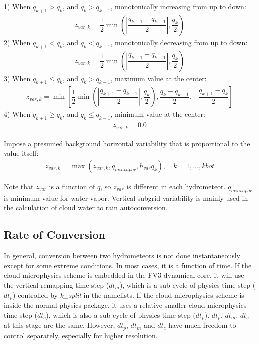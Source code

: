 \documentclass[letterpaper,titlepage,10pt]{article}
\numberwithin{equation}{section}
\begin{document}
1) When $q_{k+1} > q_{k}$, and $q_{k} > q_{k-1}$, monotonically increasing from up to down:
\begin{gather}
	z_{var,k} = \dfrac{1}{2} \min \left(\left|\dfrac{q_{k+1} - q_{k-1}}{2} \right|, \dfrac{q_{k}}{2} \right)
\end{gather}
2) When $q_{k+1} < q_{k}$, and $q_{k} < q_{k-1}$, monotonically decreasing from up to down:
\begin{gather}
	z_{var,k} = \dfrac{1}{2} \min \left(\left|\dfrac{q_{k+1} - q_{k-1}}{2} \right|, \dfrac{q_{k}}{2} \right)
\end{gather}
3) When $q_{k+1} \leq q_{k}$, and $q_{k} > q_{k-1}$, maximum value at the center:
\begin{gather}
	z_{var,k} = \min \left[\dfrac{1}{2} \min \left(\left|\dfrac{q_{k+1} - q_{k-1}}{2} \right|, \dfrac{q_{k}}{2} \right), \dfrac{q_{k} - q_{k-1}}{2}, - \dfrac{q_{k+1} - q_{k}}{2} \right]
\end{gather}
4) When $q_{k+1} \geq q_{k}$, and $q_{k} \leq q_{k-1}$, minimum value at the center:
\begin{gather}
	z_{var,k} = 0.0
\end{gather}

Impose a presumed background horizontal variability that is proportional to the value itself:
\begin{gather}
	z_{var,k} = \max \left(z_{var,k}, q_{minvapor}, h_{var} q_k \right), \quad k = 1,...,kbot
\end{gather}

Note that $z_{var}$ is a function of $q$, so $z_{var}$ is different in each hydrometeor. $q_{minvapor}$ is minimum value for water vapor. Vertical subgrid variability is mainly used in the calculation of cloud water to rain autoconversion.


\subsection{Rate of Conversion}

In general, conversion between two hydrometeors is not done instantaneously except for some extreme conditions. In most cases, it is a function of time. If the cloud microphysics scheme is embedded in the FV3 dynamical core, it will use the vertical remapping time step ($dt_m$), which is a sub-cycle of physics time step ($dt_p$) controlled by \textit{k\_split} in the namelists. If the cloud microphysics scheme is inside the normal physics package, it uses a relative smaller cloud microphysics time step ($dt_c$), which is also a sub-cycle of physics time step ($dt_p$). $dt_p$, $dt_m$, $dt_c$ at this stage are the same. However, $dt_p$, $dt_m$ and $dt_c$ have much freedom to control separately, especially for higher resolution.
\end{document}
